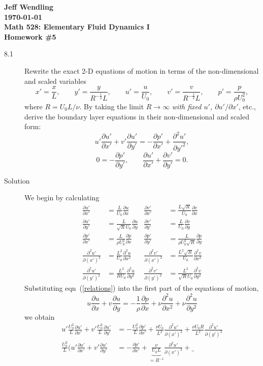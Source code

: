 \documentclass[11pt]{article}
\newcommand{\eq}[1]{\begin{align*}#1\end{align*}}
\newcommand{\eqr}[1]{eqn~(\ref{#1})}
\newcommand{\fp}[2]{\frac{\partial#1}{\partial#2}}
\newcommand{\fpp}[2]{\frac{\partial^2 #1}{\partial#2^2}}
\begin{document}
\begin{center}
{\large\bf 
Jeff Wendling\\
\today\\
Math 528: Elementary Fluid Dynamics I\\
Homework \#5
}
\end{center}
\begin{description}
\item[8.1] Rewrite the exact 2-D equations of motion in terms of the non-dimensional
and scaled variables
$$
  x' = \frac{x}{L},
  \qquad
  y' = \frac{y}{R^{-\frac{1}{2}}L},
  \qquad
  u' = \frac{u}{U_0},
  \qquad
  v' = \frac{v}{R^{-\frac{1}{2}}L},
  \qquad
  p' = \frac{p}{\rho U_0^2},
$$
where $R = U_0L/\nu$. By taking the limit $R \rightarrow \infty$
\emph{with fixed $u'$, $\partial u' / \partial x'$}, etc., derive the boundary
layer equations in their non-dimensional and scaled form:
$$
  u' \fp{u'}{x'} + v'\fp{u'}{y'} = -\fp{p'}{x'} + \fpp{u'}{y'},
$$
$$
  0 = -\fp{p'}{y'},
  \qquad
  \fp{u'}{x'} + \fp{v'}{y'} = 0.
$$
\item[Solution] We begin by calculating
\begin{align}
\label{relations}
\nonumber  \fp{u'}{x'} &= \frac{L}{U_0} \fp{u}{x} &
           \fp{v'}{x'} &= \frac{L\sqrt{R}}{U_0} \fp{v}{x} \\
\nonumber  \fp{u'}{y'} &= \frac{L}{\sqrt{R}U_0} \fp{u}{y} &
           \fp{v'}{y'} &= \frac{L}{U_0} \fp{v}{y} \\
\nonumber  \fp{p'}{x'} &= \frac{L}{\rho U_0^2} \fp{p}{x} &
           \fp{p'}{y'} &= \frac{L}{\rho U_0^2 \sqrt{R}} \fp{p}{y} \\
\nonumber  \fpp{u'}{(x')} &= \frac{L^2}{U_0} \fpp{u}{x} &
           \fpp{v'}{(x')} &= \frac{L^2\sqrt{R}}{U_0} \fpp{v}{x} \\
           \fpp{u'}{(y')} &= \frac{L^2}{RU_0} \fpp{u}{y} &
           \fpp{v'}{(y')} &= \frac{L^2}{\sqrt{R}U_0} \fpp{v}{y}
\end{align}
Substituting \eqr{relations} into the first part of the equations of motion,
$$
  u \fp{u}{x} + v \fp{u}{y} = -\frac{1}{\rho} \fp{p}{x} + \nu \fpp{u}{x} + \nu \fpp{u}{y}
$$
we obtain
\eq{
  u' \frac{U_0^2}{L} \fp{u'}{x'}
  + v' \frac{U_0^2}{L} \fp{u'}{y'}
  &= 
  -\frac{U_0^2}{L} \fp{p'}{x'}
  + \frac{\nu U_0}{L^2} \fpp{u'}{(x')}
  + \frac{\nu U_0 R}{L^2} \fpp{u'}{(y')}
  \\
%
%
  \frac{U_0^2}{L}\bigg(
  u' \fp{u'}{x'}
  + v' \fp{u'}{y'}
  &=
  - \fp{p'}{x'}
  + \underbrace{
    \frac{\nu}{U_0 L}
  }_{=R^{-1}}
  \fpp{u'}{(x')}
  + \underbrace{
}}
\end{description}
\end{document}
